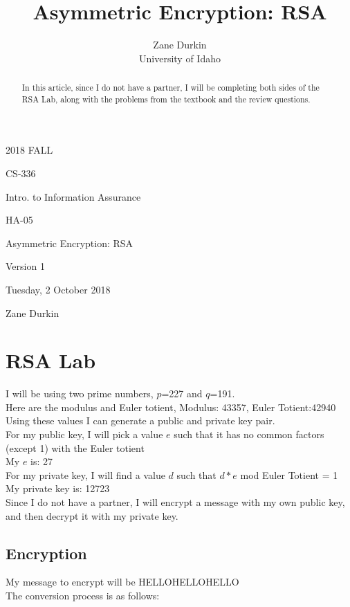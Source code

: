 \documentclass[14pt]{article}
\begin{document}
\title{Asymmetric Encryption: RSA}

\author{Zane Durkin\\
    University of Idaho}
\begin{description}[leftmargin=!, labelwidth=\widthof{\bfseries Author(s) Name(s)}]
\item [Year and Semester] 2018 FALL
\item [Course Number] CS-336
\item [Course Title] Intro. to Information Assurance
\item [Work Number] HA-05
\item [Work Name] Asymmetric Encryption: RSA
\item [Work Version] Version 1
\item [Long Date] Tuesday, 2 October 2018
\item [Author(s) Name(s)] Zane Durkin
\end{description}
\begin{abstract}
In this article, since I do not have a partner, I will be completing both sides of the RSA Lab, along with the problems from the textbook and the review questions.
\end{abstract}

\section{RSA Lab}
I will be using two prime numbers, $p$=227 and $q$=191.\\
Here are the modulus and Euler totient, Modulus: 43357, Euler Totient:42940\\
Using these values I can generate a public and private key pair.\\
For my public key, I will pick a value $e$ such that it has no common factors (except 1) with the Euler totient\\
My $e$ is: 27\\
For my private key, I will find a value $d$ such that $d*e $ mod Euler Totient = 1\\
My private key is: 12723\\
Since I do not have a partner, I will encrypt a message with my own public key, and then decrypt it with my private key.
\subsection{Encryption}
My message to encrypt will be HELLOHELLOHELLO\\
The conversion process is as follows:
\end{document}
